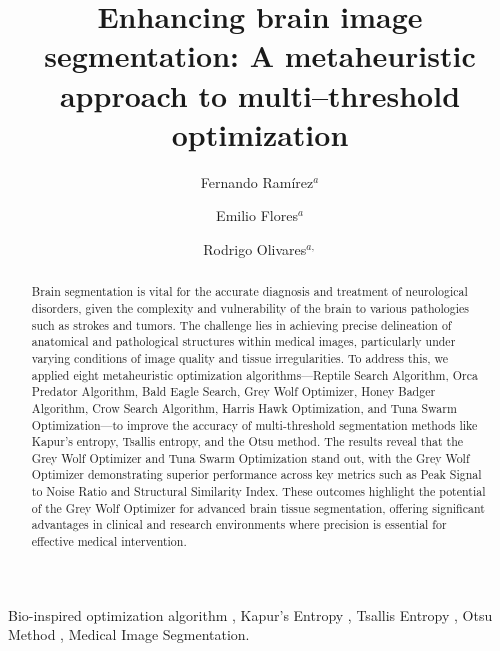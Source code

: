 \documentclass{elsarticle}
\def\corref#1{}%
\begin{document}
\begin{frontmatter}

\title{Enhancing brain image segmentation: A metaheuristic approach to multi--threshold optimization}





\author{Fernando Ram\'irez$^{a}$}

\author{Emilio Flores$^{a}$}

\author{Rodrigo Olivares\corref{cor}$^{a,}$}

\address{$^{a}$Escuela de Ingenier\'ia Inform\'atica, Universidad de Valpara\'iso, 2362905, Valpara\'iso, Chile.}

\begin{abstract}
Brain segmentation is vital for the accurate diagnosis and treatment of neurological disorders, given the complexity and vulnerability of the brain to various pathologies such as strokes and tumors. The challenge lies in achieving precise delineation of anatomical and pathological structures within medical images, particularly under varying conditions of image quality and tissue irregularities. To address this, we applied eight metaheuristic optimization algorithms---Reptile Search Algorithm, Orca Predator Algorithm, Bald Eagle Search, Grey Wolf Optimizer, Honey Badger Algorithm, Crow Search Algorithm, Harris Hawk Optimization, and Tuna Swarm Optimization---to improve the accuracy of multi-threshold segmentation methods like Kapur’s entropy, Tsallis entropy, and the Otsu method. The results reveal that the Grey Wolf Optimizer and Tuna Swarm Optimization stand out, with the Grey Wolf Optimizer demonstrating superior performance across key metrics such as Peak Signal to Noise Ratio and Structural Similarity Index. These outcomes highlight the potential of the Grey Wolf Optimizer for advanced brain tissue segmentation, offering significant advantages in clinical and research environments where precision is essential for effective medical intervention.
\end{abstract}
\begin{keyword}
Bio-inspired optimization algorithm \sep
Kapur's Entropy \sep
Tsallis Entropy \sep 
Otsu Method \sep 
Medical Image Segmentation.
\end{keyword}

\end{frontmatter}
\end{document}
